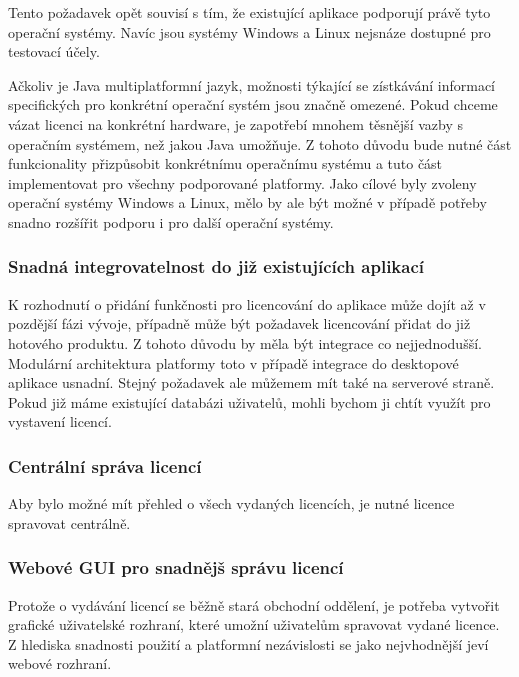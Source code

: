 Tento požadavek opět souvisí s tím, že existující aplikace podporují právě tyto
operační systémy. Navíc jsou systémy Windows a Linux nejsnáze dostupné pro
testovací účely. 

Ačkoliv je Java multiplatformní jazyk, možnosti týkající se zístkávání informací
specifických pro konkrétní operační systém jsou značně omezené. Pokud chceme
vázat licenci na konkrétní hardware, je zapotřebí mnohem těsnější vazby s
operačním systémem, než jakou Java umožňuje. Z tohoto důvodu bude nutné část
funkcionality přizpůsobit konkrétnímu operačnímu systému a tuto část
implementovat pro všechny podporované platformy. Jako cílové byly zvoleny
operační systémy Windows a Linux, mělo by ale být možné v případě potřeby snadno
rozšířit podporu i pro další operační systémy.


\subsubsection*{Snadná integrovatelnost do již existujících aplikací}
 
K rozhodnutí o přidání funkčnosti pro licencování do aplikace může dojít až v
pozdější fázi vývoje, případně může být požadavek licencování přidat do již
hotového produktu. Z tohoto důvodu by měla být integrace co nejjednodušší.
Modulární architektura platformy  toto v případě integrace do
desktopové aplikace usnadní. Stejný požadavek ale můžemem mít také na serverové
straně. Pokud již máme existující databázi uživatelů, mohli bychom ji chtít
využít pro vystavení licencí.
  
\subsubsection*{Centrální správa licencí}

Aby bylo možné mít přehled o všech vydaných licencích, je nutné licence
spravovat centrálně.

\subsubsection*{Webové GUI pro snadnějš správu licencí}

Protože o vydávání licencí se běžně stará obchodní oddělení, je potřeba
vytvořit grafické uživatelské rozhraní, které umožní uživatelům spravovat vydané
licence. Z hlediska snadnosti použití a platformní nezávislosti se jako
nejvhodnější jeví webové rozhraní.


